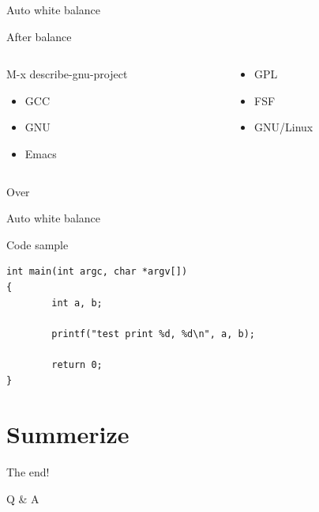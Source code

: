 \documentclass[presentation]{beamer}
\begin{document}
\begin{frame}[label={sec:org08acebb}]{Auto white balance}
\begin{block}{After balance}
\begin{columns}
\begin{column}{0.45\columnwidth}
\begin{block}{M-x describe-gnu-project}
\begin{itemize}
\item GCC
\item GNU
\item Emacs
\end{itemize}
\end{block}
\end{column}
\begin{column}{0.45\columnwidth}
\begin{block}{}
\begin{itemize}
\item GPL
\item FSF
\item GNU/Linux
\end{itemize}
\end{block}
\end{column}
\end{columns}
\begin{block}{Over}
\end{block}
\end{block}
\end{frame}
\begin{frame}[label={sec:org197edb0},fragile]{Auto white balance}
 \begin{block}{Code sample}
\begin{verbatim}
int main(int argc, char *argv[])
{
        int a, b;

        printf("test print %d, %d\n", a, b);

        return 0;
}

\end{verbatim}
\end{block}
\end{frame}
\section{Summerize}
\label{sec:org6528f32}
\begin{frame}[label={sec:org45e4047}]{The end!}
\begin{block}{Q \& A}
\end{block}
\end{frame}
\end{document}
